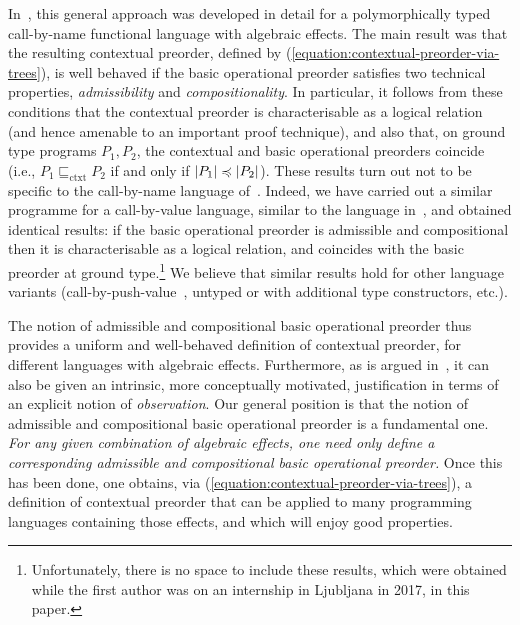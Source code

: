 In~\cite{gom}, this general approach was developed in detail for 
a polymorphically typed call-by-name functional language with algebraic effects. 
The main result was that the resulting contextual preorder, defined by (\ref{equation:contextual-preorder-via-trees}), is well behaved if the basic operational preorder satisfies two technical properties, \emph{admissibility} and \emph{compositionality}. In particular, it follows from these conditions that 
the contextual preorder is characterisable as a {logical relation} (and hence amenable to an important proof technique), and also that, on ground type programs $P_1,P_2$,
the contextual and basic operational preorders coincide (i.e., $P_1 \sqsubseteq_\text{ctxt} P_2$ if and only if
$|P_1| \preccurlyeq |P_2|$). These results turn out not to be specific to the call-by-name language of~\cite{gom}.
Indeed, we have carried out a similar programme for a call-by-value language,
similar to the language in~\cite{plotkin2001adequacy}, and obtained identical results: if the basic operational preorder is admissible and compositional then it is characterisable as a logical relation, 
and coincides with the basic preorder at ground type.\footnote{\label{footnote:unpublished}Unfortunately, there is no space to include these results, which were obtained while the first author was on an internship in Ljubljana in 2017, in this paper.}
We believe that similar results hold for other language variants (call-by-push-value~\cite{LevyCBPV}, untyped or with additional type constructors, etc.). %



The
notion of admissible and  compositional basic operational preorder thus provides a uniform and well-behaved definition of contextual preorder, for different languages with algebraic effects. Furthermore,
as is argued in~\cite[\S{V}]{gom}, it can also be given an intrinsic, more conceptually motivated, justification in terms of an explicit  notion of \emph{observation}. 
Our general position is that the notion of admissible and  compositional basic operational preorder is a fundamental one. 
\emph{For any given combination of algebraic effects, one need only define a corresponding admissible and compositional basic operational preorder.} Once this has been done,  one obtains, via (\ref{equation:contextual-preorder-via-trees}), a definition of contextual preorder that can be applied to many programming languages containing those effects, and which will enjoy good properties.

